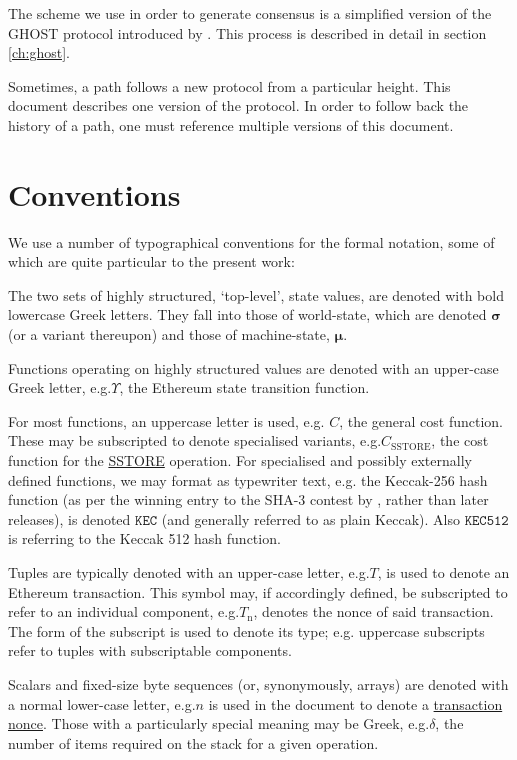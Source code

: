 \documentclass[9pt,oneside]{amsart}
\makeatletter
\newcommand*\eg{e.g.\@\xspace}
\makeatother
\begin{document}
\begin{multicols}{2}
The scheme we use in order to generate consensus is a simplified version of the GHOST protocol introduced by \cite{cryptoeprint:2013:881}. This process is described in detail in section \ref{ch:ghost}.

Sometimes, a path follows a new protocol from a particular height.  This document describes one version of the protocol.  In order to follow back the history of a path, one must reference multiple versions of this document.

\section{Conventions}\label{ch:conventions}

We use a number of typographical conventions for the formal notation, some of which are quite particular to the present work:

The two sets of highly structured, `top-level', state values, are denoted with bold lowercase Greek letters. They fall into those of world-state, which are denoted $\boldsymbol{\sigma}$ (or a variant thereupon) and those of machine-state, $\boldsymbol{\mu}$.

Functions operating on highly structured values are denoted with an upper-case Greek letter, \eg \hyperlink{Upsilon_state_transition}{$\Upsilon$}, the Ethereum state transition function.

For most functions, an uppercase letter is used, e.g. $C$, the general cost function. These may be subscripted to denote specialised variants, \eg \hyperlink{C__SSTORE}{$C_\text{SSTORE}$}, the cost function for the \hyperlink{SSTORE}{{\tiny SSTORE}} operation. For specialised and possibly externally defined functions, we may format as typewriter text, \eg the Keccak-256 hash function (as per the winning entry to the SHA-3 contest by \cite{Keccak}, rather than later releases), is denoted $\texttt{KEC}$ (and generally referred to as plain Keccak). Also $\texttt{KEC512}$ is referring to the Keccak 512 hash function.

Tuples are typically denoted with an upper-case letter, \eg $T$, is used to denote an Ethereum transaction. This symbol may, if accordingly defined, be subscripted to refer to an individual component, \eg \hyperlink{transaction_nonce}{$T_{\mathrm{n}}$}, denotes the nonce of said transaction. The form of the subscript is used to denote its type; \eg uppercase subscripts refer to tuples with subscriptable components.

Scalars and fixed-size byte sequences (or, synonymously, arrays) are denoted with a normal lower-case letter, \eg $n$ is used in the document to denote a \hyperlink{transaction_nonce}{transaction nonce}. Those with a particularly special meaning may be Greek, \eg $\delta$, the number of items required on the stack for a given operation.


\end{multicols}
\end{document}
